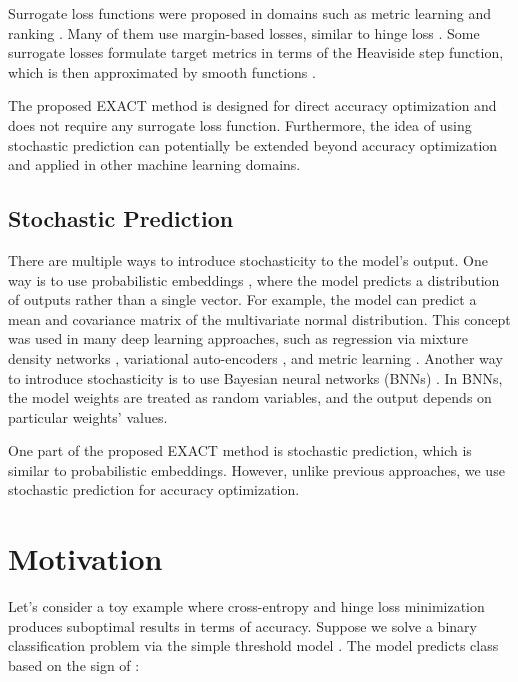 \documentclass[nohyperref]{article}
\theoremstyle{plain}
\theoremstyle{definition}
\theoremstyle{remark}
\begin{document}
Surrogate loss functions were proposed in domains such as metric learning and ranking \cite{kaya2019metricsurvey, calauzenes2012surrogaterank}. Many of them use margin-based losses, similar to hinge loss \cite{weinberger2009triplet}. Some surrogate losses formulate target metrics in terms of the Heaviside step function, which is then approximated by smooth functions \cite{patel2021recallsurrogate}.

The proposed EXACT method is designed for direct accuracy optimization and does not require any surrogate loss function. Furthermore, the idea of using stochastic prediction can potentially be extended beyond accuracy optimization and applied in other machine learning domains.



\subsection{Stochastic Prediction}

There are multiple ways to introduce stochasticity to the model's output. One way is to use probabilistic embeddings \cite{shi2019probabilistic}, where the model predicts a distribution of outputs rather than a single vector. For example, the model can predict a mean and covariance matrix of the multivariate normal distribution. This concept was used in many deep learning approaches, such as regression via mixture density networks \cite{bishop1994mixture}, variational auto-encoders \cite{kingma2014vae}, and metric learning \cite{chang2020data}. Another way to introduce stochasticity is to use Bayesian neural networks (BNNs) \cite{goan2020bayesian}. In BNNs, the model weights are treated as random variables, and the output depends on particular weights' values.




One part of the proposed EXACT method is stochastic prediction, which is similar to probabilistic embeddings. However, unlike previous approaches, we use stochastic prediction for accuracy optimization.







\section{Motivation}

Let's consider a toy example where cross-entropy and hinge loss minimization produces suboptimal results in terms of accuracy. Suppose we solve a binary classification problem via the simple threshold model . The model predicts class  based on the sign of :
\end{document}
